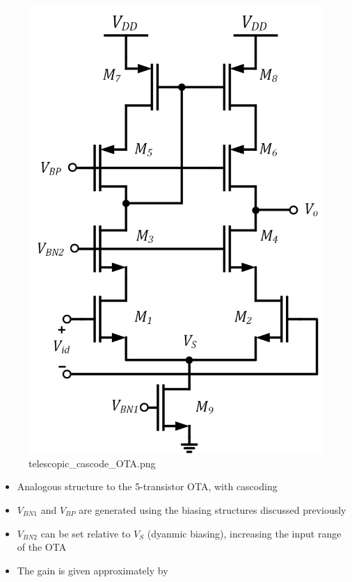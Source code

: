 \documentclass[11pt]{article}
\begin{document}
    \begin{figure}
\centering
\includegraphics{telescopic_cascode_OTA.png}
\caption{telescopic\_cascode\_OTA.png}
\end{figure}

    \begin{itemize}
\item
  Analogous structure to the 5-transistor OTA, with cascoding
\item
  \(V_{BN1}\) and \(V_{BP}\) are generated using the biasing structures
  discussed previously
\item
  \(V_{BN2}\) can be set relative to \(V_S\) (dyanmic biasing),
  increasing the input range of the OTA
\item
  The gain is given approximately by
\end{itemize}
\end{document}
